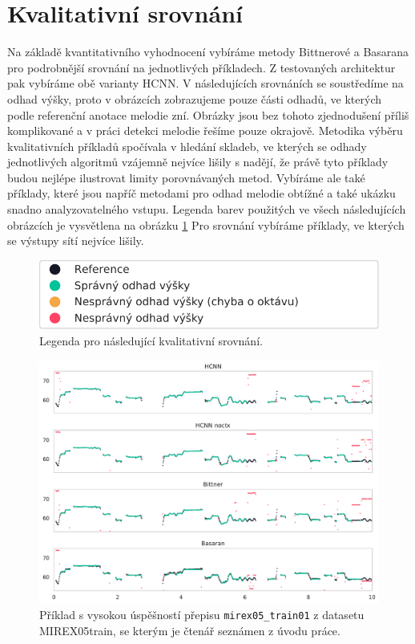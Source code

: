 \section{Kvalitativní srovnání}

Na základě kvantitativního vyhodnocení vybíráme metody Bittnerové a Basarana pro podrobnější srovnání na jednotlivých příkladech. Z testovaných architektur pak vybíráme obě varianty HCNN. V následujících srovnáních se soustředíme na odhad výšky, proto v obrázcích zobrazujeme pouze části odhadů, ve kterých podle referenční anotace melodie zní. Obrázky jsou bez tohoto zjednodušení příliš komplikované a v práci detekci melodie řešíme pouze okrajově. Metodika výběru kvalitativních příkladů spočívala v hledání skladeb, ve kterých se odhady jednotlivých algoritmů vzájemně nejvíce lišily s nadějí, že právě tyto příklady budou nejlépe ilustrovat limity porovnávaných metod. Vybíráme ale také příklady, které jsou napříč metodami pro odhad melodie obtížné a také ukázku snadno analyzovatelného vstupu. Legenda barev použitých ve všech následujících obrázcích je vysvětlena na obrázku \ref{obr:legenda}
 Pro srovnání vybíráme příklady, ve kterých se výstupy sítí nejvíce lišily.

\begin{figure}[h]\centering
\includegraphics[scale=0.75]{../img/legenda}
\caption{Legenda pro následující kvalitativní srovnání.}
\label{obr:legenda}
\end{figure}

\begin{figure}[h]\centering
\includegraphics[width=\textwidth,height=\textheight,keepaspectratio]{../img/vysledky/mirex05_train01}
\caption{Příklad s vysokou úspěšností přepisu \texttt{mirex05\_train01} z datasetu MIREX05train, se kterým je čtenář seznámen z úvodu práce.}
\label{obr:mirex05_train01}
\end{figure}

